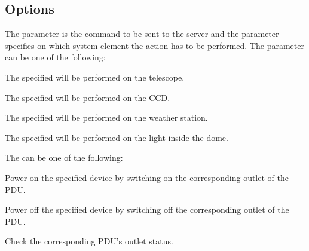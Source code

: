 \documentclass[a4paper,english]{article}
\begin{document}
\subsection{Options}

The  parameter is the command to be sent to the server and the  parameter specifies on which system element the action has to be performed. The  parameter can be one of the following:

\begin{Description}\setlength{\itemsep}{0cm}
\item[\Arg{telescope}] The specified  will be performed on the telescope.

	    

\item[\Arg{ccd}] The specified  will be performed on the CCD.

	    

\item[\Arg{vaisala}] The specified  will be performed on the weather station.

	    

\item[\Arg{light}] The specified  will be performed on the light inside the dome.

	    

\end{Description}

The  can be one of the following:

\begin{Description}\setlength{\itemsep}{0cm}
\item[\Arg{power\_on}] Power on the specified device by switching on the corresponding outlet of the PDU.

	    

\item[\Arg{power\_off}] Power off the specified device by switching off the corresponding outlet of the PDU.

	    

\item[\Arg{power\_status}] Check the corresponding PDU's outlet status.

	    

\end{Description}
\end{document}
